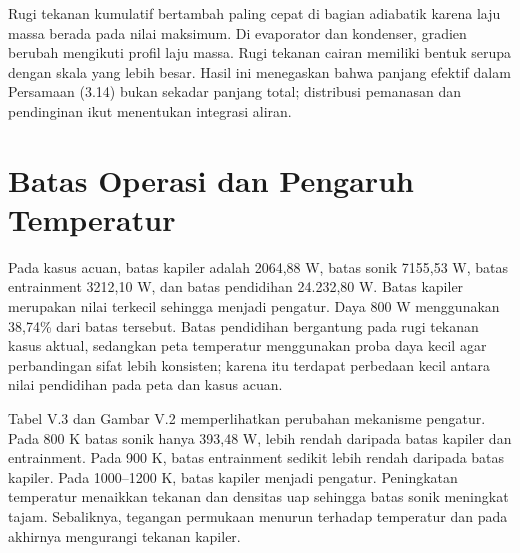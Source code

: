 \documentclass[
  12pt,
  12pt,a4paper,oneside]{report}
\begin{document}
Rugi tekanan kumulatif bertambah paling cepat di bagian adiabatik karena
laju massa berada pada nilai maksimum. Di evaporator dan kondenser,
gradien berubah mengikuti profil laju massa. Rugi tekanan cairan
memiliki bentuk serupa dengan skala yang lebih besar. Hasil ini
menegaskan bahwa panjang efektif dalam Persamaan (3.14) bukan sekadar
panjang total; distribusi pemanasan dan pendinginan ikut menentukan
integrasi aliran.

\hypertarget{batas-operasi-dan-pengaruh-temperatur}{%
\section{Batas Operasi dan Pengaruh
Temperatur}\label{batas-operasi-dan-pengaruh-temperatur}}

Pada kasus acuan, batas kapiler adalah 2064,88 W, batas sonik 7155,53 W,
batas entrainment 3212,10 W, dan batas pendidihan 24.232,80 W. Batas
kapiler merupakan nilai terkecil sehingga menjadi pengatur. Daya 800 W
menggunakan 38,74\% dari batas tersebut. Batas pendidihan bergantung
pada rugi tekanan kasus aktual, sedangkan peta temperatur menggunakan
proba daya kecil agar perbandingan sifat lebih konsisten; karena itu
terdapat perbedaan kecil antara nilai pendidihan pada peta dan kasus
acuan.

Tabel V.3 dan Gambar V.2 memperlihatkan perubahan mekanisme pengatur.
Pada 800 K batas sonik hanya 393,48 W, lebih rendah daripada batas
kapiler dan entrainment. Pada 900 K, batas entrainment sedikit lebih
rendah daripada batas kapiler. Pada 1000--1200 K, batas kapiler menjadi
pengatur. Peningkatan temperatur menaikkan tekanan dan densitas uap
sehingga batas sonik meningkat tajam. Sebaliknya, tegangan permukaan
menurun terhadap temperatur dan pada akhirnya mengurangi tekanan
kapiler.
\end{document}

